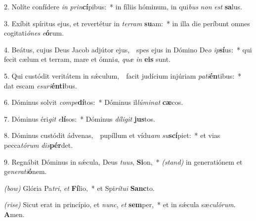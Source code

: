 2. Nolíte confídere \textit{in} \textit{prin}\textbf{cí}pibus:~*
	in fíliis hóminum, in qui\textit{bus} \textit{non} \textit{est} \textbf{sa}lus.

3. Exíbit spíritus ejus, et revertétur in \textit{ter}\textit{ram} \textbf{su}am:~*
	in illa die períbunt omnes cogitati\textit{ó}\textit{nes} \textit{e}\textbf{ó}rum.

4. Beátus, cujus Deus Jacob adjútor ejus,~\GreDagger\
	spes ejus in Dómino De\textit{o} \textit{ip}\textbf{sí}us:~*
	qui fecit cælum et terram, mare et ómni\textit{a}, \textit{quæ} \textit{in} \textbf{e}\textbf{is} sunt.

5. Qui custódit veritátem in s\'{\ae}cu\-lum,~\GreDagger\
	facit judícium injúriam \textit{pa}\textit{ti}\-\textbf{én}tibus:~*
	dat escam \textit{e}\textit{su}\textit{ri}\textbf{én}\textbf{ti}bus.

6. Dóminus solvit \textit{com}\textit{pe}\textbf{dí}tos:~*
	Dóminus il\textit{lú}\textit{mi}\textit{nat} \textbf{cæ}cos.

7. Dóminus éri\textit{git} \textit{e}\textbf{lí}sos:~*
	Dóminus \textit{dí}\textit{li}\textit{git} \textbf{jus}tos.

8. Dóminus custódit ádvenas,~\GreDagger\
	pupíllum et vídu\textit{am} \textit{su}\textbf{scí}piet:~*
	et vias pecca\textit{tó}\textit{rum} \textit{dis}\textbf{pér}det.

9. Regnábit Dóminus in s\'{\ae}cula, Deus \textit{tu}\textit{us}, \textbf{Si}on,~* {\color{red}\textit{(stand)}}
	in generatiónem et ge\textit{ne}\textit{ra}\textit{ti}\textbf{ó}nem.

{\color{red}\textit{(bow)}} Glória Pa\textit{tri}, \textit{et} \textbf{Fí}lio,~*
	et Spi\textit{rí}\textit{tu}\textit{i} \textbf{Sanc}to.

{\color{red}\textit{(rise)}} Sicut erat in princípio, et \textit{nunc}, \textit{et} \textbf{sem}per,~*
	et in s\'{\ae}cula sæ\textit{cu}\textit{ló}\textit{rum}. \textbf{A}men.